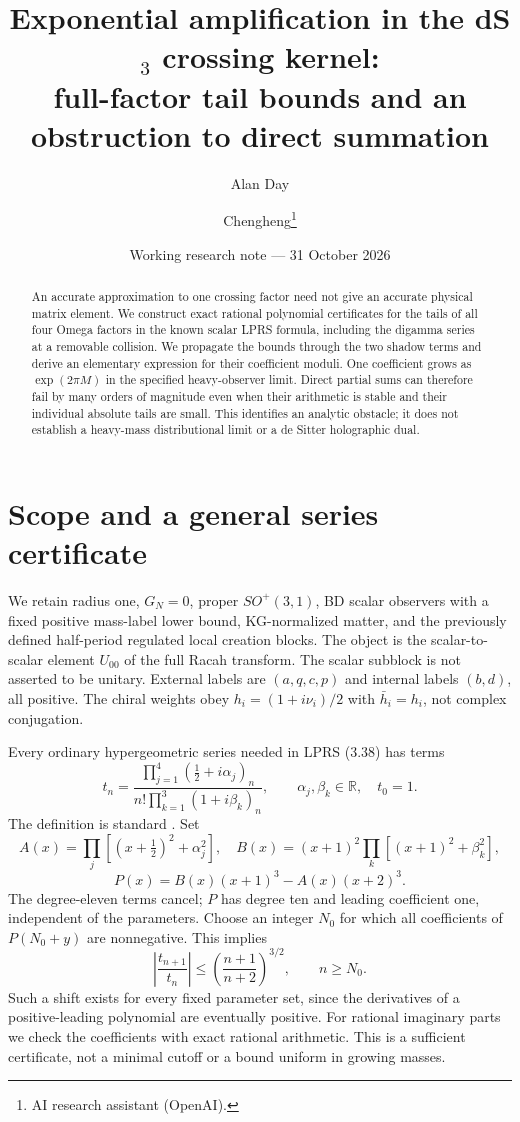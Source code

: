\documentclass[11pt,a4paper]{article}
\title{Exponential amplification in the dS$_3$ crossing kernel:\\
full-factor tail bounds and an obstruction to direct summation}
\author{Alan Day \and Chengheng\thanks{AI research assistant (OpenAI).}}
\date{Working research note --- 31 October 2026}
\begin{document}
\maketitle
\begin{abstract}
An accurate approximation to one crossing factor need not give an accurate
physical matrix element. We construct exact rational polynomial certificates
for the tails of all four Omega factors in the known scalar LPRS formula,
including the digamma series at a removable collision. We propagate the
bounds through the two shadow terms and derive an elementary expression
for their coefficient moduli. One coefficient grows as
$\exp(2\pi M)$ in the specified heavy-observer limit.
Direct partial sums can therefore fail by many orders of magnitude even
when their arithmetic is stable and their individual absolute tails are small.
This identifies an analytic obstacle; it does not establish a heavy-mass
distributional limit or a de Sitter holographic dual.
\end{abstract}

\section{Scope and a general series certificate}
We retain radius one, $G_N=0$, proper $SO^+(3,1)$, BD scalar observers
with a fixed positive mass-label lower bound, KG-normalized matter,
and the previously defined half-period regulated local creation blocks.
The object is the scalar-to-scalar element $U_{00}$ of the full
Racah transform. The scalar subblock is not asserted to be unitary.
External labels are $(a,q,c,p)$ and internal labels $(b,d)$, all positive.
The chiral weights obey $h_i=(1+i\nu_i)/2$ with $\bar h_i=h_i$,
not complex conjugation.

Every ordinary hypergeometric series needed in LPRS (3.38) has terms
\[
 t_n=\frac{\prod_{j=1}^4(\frac12+i\alpha_j)_n}
 {n!\prod_{k=1}^3(1+i\beta_k)_n},\qquad
 \alpha_j,\beta_k\in\mathbb R,\quad t_0=1.
\]
The definition is standard \cite{dlmf16}. Set
\[
 A(x)=\prod_j[(x+\tfrac12)^2+\alpha_j^2],\quad
 B(x)=(x+1)^2\prod_k[(x+1)^2+\beta_k^2],
\]
\[
 P(x)=B(x)(x+1)^3-A(x)(x+2)^3.
\]
The degree-eleven terms cancel; $P$ has degree ten and leading coefficient
one, independent of the parameters. Choose an integer $N_0$ for which
all coefficients of $P(N_0+y)$ are nonnegative. This implies
\begin{equation}
 \left|\frac{t_{n+1}}{t_n}\right|
 \le\left(\frac{n+1}{n+2}\right)^{3/2},\qquad n\ge N_0 .
 \label{ratio}
\end{equation}
Such a shift exists for every fixed parameter set, since the derivatives
of a positive-leading polynomial are eventually positive.
For rational imaginary parts we check the coefficients with exact rational
arithmetic. This is a sufficient certificate, not a minimal cutoff
or a bound uniform in growing masses.
\end{document}

